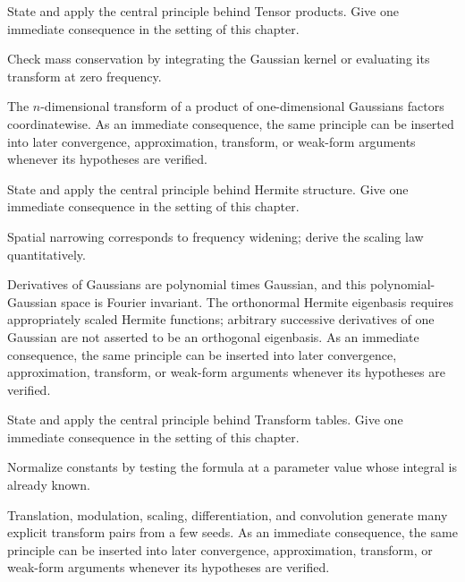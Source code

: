 \begin{exercise}\label{exr:iii12-06}
State and apply the central principle behind Tensor products. Give one immediate consequence in the setting of this chapter.
\end{exercise}
\begin{hint}
Check mass conservation by integrating the Gaussian kernel or evaluating its transform at zero frequency.
\end{hint}
\begin{solution}
The $n$-dimensional transform of a product of one-dimensional Gaussians factors coordinatewise. As an immediate consequence, the same principle can be inserted into later convergence, approximation, transform, or weak-form arguments whenever its hypotheses are verified.
\end{solution}

\begin{exercise}\label{exr:iii12-07}
State and apply the central principle behind Hermite structure. Give one immediate consequence in the setting of this chapter.
\end{exercise}
\begin{hint}
Spatial narrowing corresponds to frequency widening; derive the scaling law quantitatively.
\end{hint}
\begin{solution}
Derivatives of Gaussians are polynomial times Gaussian, and this polynomial-Gaussian space is Fourier invariant. The orthonormal Hermite eigenbasis requires appropriately scaled Hermite functions; arbitrary successive derivatives of one Gaussian are not asserted to be an orthogonal eigenbasis. As an immediate consequence, the same principle can be inserted into later convergence, approximation, transform, or weak-form arguments whenever its hypotheses are verified.
\end{solution}

\begin{exercise}\label{exr:iii12-08}
State and apply the central principle behind Transform tables. Give one immediate consequence in the setting of this chapter.
\end{exercise}
\begin{hint}
Normalize constants by testing the formula at a parameter value whose integral is already known.
\end{hint}
\begin{solution}
Translation, modulation, scaling, differentiation, and convolution generate many explicit transform pairs from a few seeds. As an immediate consequence, the same principle can be inserted into later convergence, approximation, transform, or weak-form arguments whenever its hypotheses are verified.
\end{solution}


